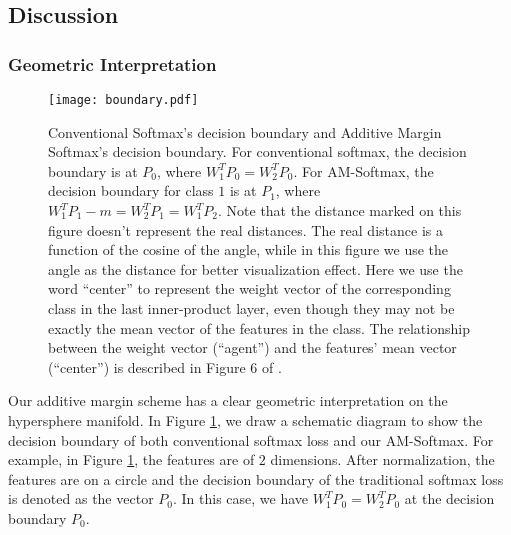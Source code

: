 \documentclass[10pt,twocolumn,letterpaper]{article}
\begin{document}
\begin{comment}
As explained in Figure 4 of \cite{wang2017normface}, optimizing $cos(\theta)$ will also enlarge the norm (magnitude) of the weights and the features. To prevent the norm from growing aggressively to infinity, we usually apply weight decay for the weight normalization. Similarly, for the feature normalization we regularize the features using feature decay. The feature decay is defined as
\begin{equation}
\mathcal{L}_{FD}  = \frac{1}{n}\sum_{i=1}^n{\|f_i\|_2^2},
\label{eq:feature_decay}
\end{equation}
which is used to prevent the norm of features from becoming too large. Without this regularization, when we set a large $s$ at the beginning, the feature norm will likely to be very large in the initial a few hundred iterations, which would cause the network diverge sometimes.
\end{comment}

\subsection{Discussion}
\label{sec:understanding}

\subsubsection{Geometric Interpretation}
\begin{figure}
	\centering
	\texttt{[image: boundary.pdf]}
	\caption{ Conventional Softmax's decision boundary and Additive Margin Softmax's decision boundary. For conventional softmax, the decision boundary is at $P_0$, where $W_1^T P_0 = W_2^T P_0$. For AM-Softmax, the decision boundary for class $1$ is at $P_1$, where $W_1^T P_1 - m = W_2^T P_1 = W_1^T P_2$. Note that the distance marked on this figure doesn't represent the real distances. The real distance is a function of the cosine of the angle, while in this figure we use the angle as the distance for better visualization effect. Here we use the word ``center'' to represent the weight vector of the corresponding class in the last inner-product layer, even though they may not be exactly the mean vector of the features in the class. The relationship between the weight vector (``agent'') and the features' mean vector (``center'') is described in Figure 6 of \cite{wang2017normface}.
	}
	\label{fig:boundary}
\end{figure}
Our additive margin scheme has a clear geometric interpretation on the hypersphere manifold. In Figure \ref{fig:boundary}, we draw a schematic diagram to show the decision boundary of both conventional softmax loss and our AM-Softmax. For example, in Figure \ref{fig:boundary}, the features are of $2$ dimensions. After normalization, the features are on a circle and the decision boundary of the traditional softmax loss is denoted as the vector $P_0$. In this case, we have $W_1^T P_0 = W_2^T P_0$ at the decision boundary $P_0$. 
\end{document}
